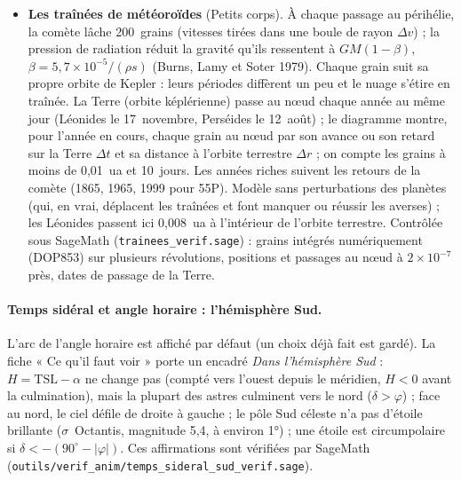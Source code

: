 \begin{itemize}
38,7~\% ($\Delta m=0{,}53$) en 58~min. Contrôlée sous SageMath (\texttt{mutuels\_verif.sage}) : aire commune par
quadrature, éclat à des instants donnés (exact pour les occultations, intégrale double pour les éclipses, à
$2\times10^{-7}$ près), premiers et derniers contacts.
\item \textbf{Les traînées de météoroïdes} (Petits corps). À chaque passage au périhélie, la comète lâche 200~grains
(vitesses tirées dans une boule de rayon $\Delta v$) ; la pression de radiation réduit la gravité qu'ils ressentent à
$GM(1-\beta)$, $\beta=5{,}7\times10^{-5}/(\rho s)$ (Burns, Lamy et Soter 1979). Chaque grain suit sa propre orbite de
Kepler : leurs périodes diffèrent un peu et le nuage s'étire en traînée. La Terre (orbite képlérienne) passe au nœud
chaque année au même jour (Léonides le 17~novembre, Perséides le 12~août) ; le diagramme montre, pour l'année en
cours, chaque grain au nœud par son avance ou son retard sur la Terre $\Delta t$ et sa distance à l'orbite terrestre
$\Delta r$ ; on compte les grains à moins de 0,01~ua et 10~jours. Les années riches suivent les retours de la comète
(1865, 1965, 1999 pour 55P). Modèle sans perturbations des planètes (qui, en vrai, déplacent les traînées et font
manquer ou réussir les averses) ; les Léonides passent ici 0,008~ua à l'intérieur de l'orbite terrestre. Contrôlée sous
SageMath (\texttt{trainees\_verif.sage}) : grains intégrés numériquement (DOP853) sur plusieurs révolutions, positions et
passages au nœud à $2\times10^{-7}$ près, dates de passage de la Terre.
\end{itemize}


\paragraph{Temps sidéral et angle horaire : l'hémisphère Sud.} L'arc de l'angle horaire est affiché par défaut (un
choix déjà fait est gardé). La fiche « Ce qu'il faut voir » porte un encadré \emph{Dans l'hémisphère Sud} :
$H = \mathrm{TSL} - \alpha$ ne change pas (compté vers l'ouest depuis le méridien, $H < 0$ avant la culmination), mais
la plupart des astres culminent vers le nord ($\delta > \varphi$) ; face au nord, le ciel défile de droite à gauche ;
le pôle Sud céleste n'a pas d'étoile brillante ($\sigma$~Octantis, magnitude 5,4, à environ 1°) ; une étoile est
circumpolaire si $\delta < -(90^\circ - |\varphi|)$. Ces affirmations sont vérifiées par SageMath
(\texttt{outils/verif\_anim/temps\_sideral\_sud\_verif.sage}).

